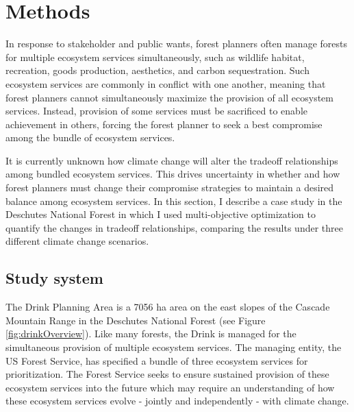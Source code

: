 \section{Methods}
\label{sec:methods}
In response to stakeholder and public wants, forest planners often manage forests for multiple ecosystem services simultaneously, such as wildlife habitat, recreation, goods production, aesthetics, and carbon sequestration. Such ecosystem services are commonly in conflict with one another, meaning that forest planners cannot simultaneously maximize the provision of all ecosystem services. Instead, provision of some services must be sacrificed to enable achievement in others, forcing the forest planner to seek a best compromise among the bundle of ecosystem services.

It is currently unknown how climate change will alter the tradeoff relationships among bundled ecosystem services. This drives uncertainty in whether and how forest planners must change their compromise strategies to maintain a desired balance among ecosystem services. In this section, I describe a case study in the Deschutes National Forest in which I used multi-objective optimization to quantify the changes in tradeoff relationships, comparing the results under three different climate change scenarios.

\subsection{Study system}
\label{subsec:studyArea}
The Drink Planning Area is a 7056 ha area on the east slopes of the Cascade Mountain Range in the Deschutes National Forest (see Figure \ref{fig:drinkOverview}). Like many forests, the Drink is managed for the simultaneous provision of multiple ecosystem services.  The managing entity, the US Forest Service, has specified a bundle of three ecosystem services for prioritization. The Forest Service seeks to ensure sustained provision of these ecosystem services into the future which may require an understanding of how these ecosystem services evolve - jointly and independently - with climate change.

